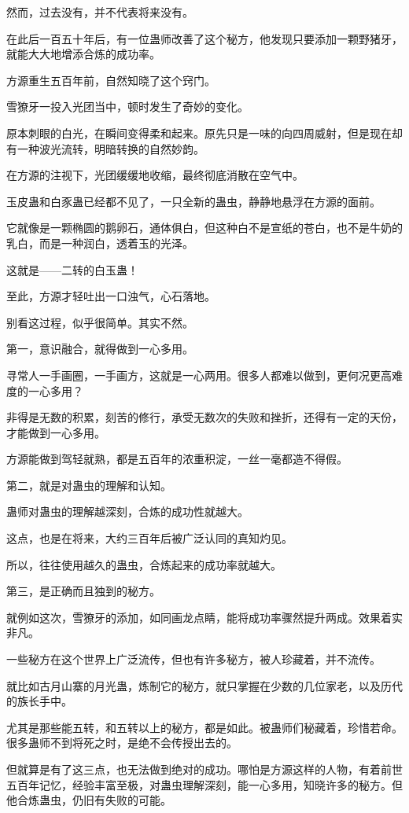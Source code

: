 \begin{this_body}
然而，过去没有，并不代表将来没有。

在此后一百五十年后，有一位蛊师改善了这个秘方，他发现只要添加一颗野猪牙，就能大大地增添合炼的成功率。

方源重生五百年前，自然知晓了这个窍门。

雪獠牙一投入光团当中，顿时发生了奇妙的变化。

原本刺眼的白光，在瞬间变得柔和起来。原先只是一味的向四周威射，但是现在却有一种波光流转，明暗转换的自然妙韵。

在方源的注视下，光团缓缓地收缩，最终彻底消散在空气中。

玉皮蛊和白豕蛊已经都不见了，一只全新的蛊虫，静静地悬浮在方源的面前。

它就像是一颗椭圆的鹅卵石，通体俱白，但这种白不是宣纸的苍白，也不是牛奶的乳白，而是一种润白，透着玉的光泽。

这就是——二转的白玉蛊！

至此，方源才轻吐出一口浊气，心石落地。

别看这过程，似乎很简单。其实不然。

第一，意识融合，就得做到一心多用。

寻常人一手画圈，一手画方，这就是一心两用。很多人都难以做到，更何况更高难度的一心多用？

非得是无数的积累，刻苦的修行，承受无数次的失败和挫折，还得有一定的天份，才能做到一心多用。

方源能做到驾轻就熟，都是五百年的浓重积淀，一丝一毫都造不得假。

第二，就是对蛊虫的理解和认知。

蛊师对蛊虫的理解越深刻，合炼的成功性就越大。

这点，也是在将来，大约三百年后被广泛认同的真知灼见。

所以，往往使用越久的蛊虫，合炼起来的成功率就越大。

第三，是正确而且独到的秘方。

就例如这次，雪獠牙的添加，如同画龙点睛，能将成功率骤然提升两成。效果着实非凡。

一些秘方在这个世界上广泛流传，但也有许多秘方，被人珍藏着，并不流传。

就比如古月山寨的月光蛊，炼制它的秘方，就只掌握在少数的几位家老，以及历代的族长手中。

尤其是那些能五转，和五转以上的秘方，都是如此。被蛊师们秘藏着，珍惜若命。很多蛊师不到将死之时，是绝不会传授出去的。

但就算是有了这三点，也无法做到绝对的成功。哪怕是方源这样的人物，有着前世五百年记忆，经验丰富至极，对蛊虫理解深刻，能一心多用，知晓许多的秘方。但他合炼蛊虫，仍旧有失败的可能。


\end{this_body}
